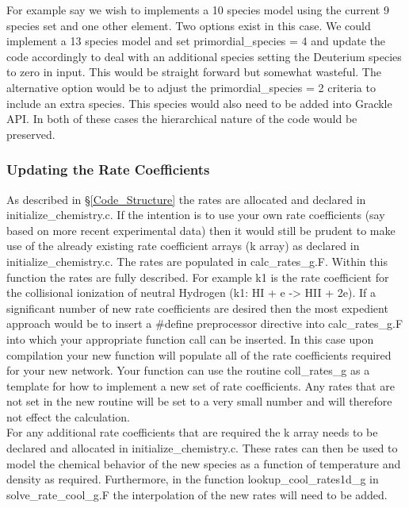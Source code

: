 For example say we wish to implements a 10 species model using the current 9 species set and one other element. 
Two options exist in this case. We could implement a 13 species model and set primordial\_species = 4 and 
update the code accordingly to deal with an additional species setting the Deuterium species to zero in input.
This would be straight forward but somewhat wasteful. The alternative option would be to adjust the 
primordial\_species = 2 criteria to include an extra species. This species would also need to be added into
Grackle API. In both of these cases the hierarchical nature of the code would be preserved. \\

\subsubsection{Updating the Rate Coefficients}
As described in \S \ref{Code_Structure} the rates are allocated and declared in initialize\_chemistry.c. If the
intention is to use your own rate coefficients (say based on more recent experimental data) then 
it would still be prudent to make use of the already existing rate coefficient arrays (k array) as declared
in initialize\_chemistry.c. The rates are populated in calc\_rates\_g.F. Within this function the rates 
are fully described. For example k1 is the rate coefficient for the collisional ionization of neutral 
Hydrogen (k1: HI + e -> HII + 2e). If a significant number of new rate coefficients are desired then 
the most expedient approach would be to insert a \#define preprocessor directive into calc\_rates\_g.F
into which your appropriate function call can be inserted. In this case upon compilation your new function 
will populate all of the rate coefficients required for your new network. Your function can use the 
routine coll\_rates\_g as a template for how to implement a new set of rate coefficients. Any rates that are not
set in the new routine will be set to a very small number and will therefore not effect the calculation.\\
\indent For any additional rate coefficients that are required the k array needs to be declared and allocated
in initialize\_chemistry.c. These rates can then be used to model the chemical behavior of the new species
as a function of temperature and density as required. Furthermore, in the function lookup\_cool\_rates1d\_g 
in solve\_rate\_cool\_g.F the interpolation of the new rates will need to be added. 



